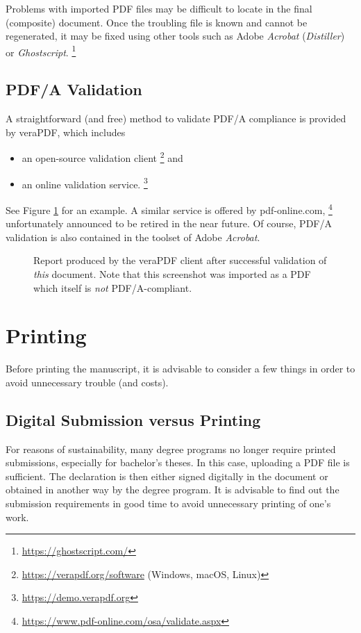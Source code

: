 Problems with imported PDF files may be difficult to locate in the final (composite)
document. Once the troubling file is known and cannot be regenerated, it may be fixed using 
other tools such as Adobe \emph{Acrobat} (\emph{Distiller}) or \emph{Ghostscript}.%
\footnote{\url{https://ghostscript.com/}}


\subsection{PDF/A Validation}
\label{sec:PDFA-validation}

A straightforward (and free) method to validate PDF/A compliance is provided by
\textsf{veraPDF}, which includes
%
\begin{itemize}
\item an open-source validation client%
  \footnote{\url{https://verapdf.org/software} (Windows, macOS, Linux)} and
\item an online validation service.%
  \footnote{\url{https://demo.verapdf.org}}
\end{itemize}
%
See Figure \ref{fig:verapdf-report} for an example.
A similar service is offered by \textsf{pdf-online.com},%
\footnote{\url{https://www.pdf-online.com/osa/validate.aspx}}
unfortunately announced to be retired in the near future.
Of course, PDF/A validation is also contained in the toolset of Adobe \emph{Acrobat}.

\begin{figure}[htbp]
    \centering
    \caption{Report produced by the \textsf{veraPDF} client after successful validation
    of \emph{this} document. Note that this screenshot was imported as a PDF 
    which itself is \emph{not} PDF/A-compliant.}
    \label{fig:verapdf-report}
\end{figure}


\section{Printing}

Before printing the manuscript, it is advisable to consider a few things in
order to avoid unnecessary trouble (and costs).

\subsection{Digital Submission versus Printing}

For reasons of sustainability, many degree programs no longer require printed
submissions, especially for bachelor's theses. In this case, uploading a PDF
file is sufficient. The declaration is then either signed digitally in the
document or obtained in another way by the degree program. It is advisable to
find out the submission requirements in good time to avoid unnecessary printing
of one's work.


